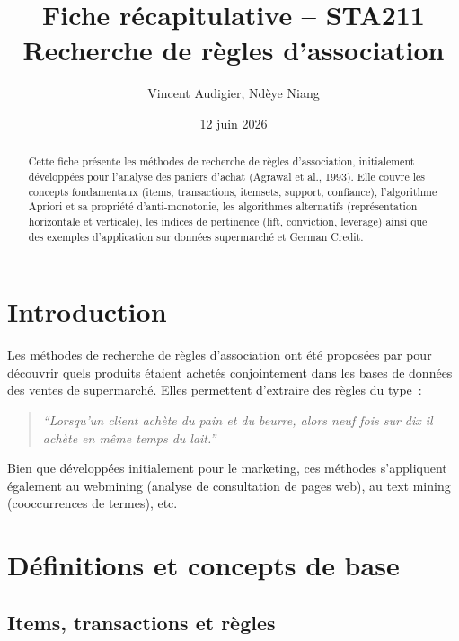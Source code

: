 \documentclass[a4paper,11pt]{article}
\title{\textbf{Fiche r\'ecapitulative -- STA211}\\[4pt]
\large Recherche de r\`egles d'association}
\author{Vincent Audigier, Nd\`eye Niang}
\date{12 juin 2026}
\theoremstyle{definition}
\theoremstyle{remark}
\begin{document}
\maketitle
\thispagestyle{empty}

\begin{abstract}
Cette fiche pr\'esente les m\'ethodes de recherche de r\`egles
d'association, initialement d\'evelopp\'ees pour l'analyse des
paniers d'achat (Agrawal et al., 1993). Elle couvre les concepts
fondamentaux (items, transactions, itemsets, support, confiance),
l'algorithme Apriori et sa propri\'et\'e d'anti-monotonie, les
algorithmes alternatifs (représentation horizontale et verticale),
les indices de pertinence (lift, conviction, leverage) ainsi que des
exemples d'application sur donn\'ees supermarch\'e et German Credit.
\end{abstract}

\vfill
\tableofcontents
\newpage

\section{Introduction}

Les m\'ethodes de recherche de r\`egles d'association ont \'et\'e
propos\'ees par \cite{Agrawal1993} pour d\'ecouvrir quels produits
\'etaient achet\'es conjointement dans les bases de donn\'ees des
ventes de supermarch\'e. Elles permettent d'extraire des r\`egles
du type~:

\begin{quote}
  \textit{``Lorsqu'un client ach\`ete du pain et du beurre, alors
    neuf fois sur dix il ach\`ete en m\^eme temps du lait.''}
\end{quote}

Bien que d\'evelopp\'ees initialement pour le marketing, ces
m\'ethodes s'appliquent \'egalement au webmining (analyse de
consultation de pages web), au text mining (cooccurrences de
termes), etc.

\section{D\'efinitions et concepts de base}

\subsection{Items, transactions et r\`egles}
\end{document}
